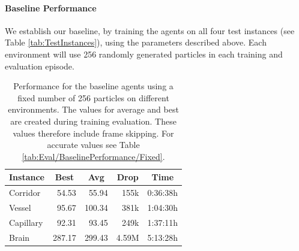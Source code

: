 \paragraph{Baseline Performance}
We establish our baseline, by training the agents on all four test instances (see Table \ref{tab:TestInstances}), using the parameters described above. Each environment will use 256 randomly generated particles in each training and evaluation episode. 

\begin{table}[htp]
    \begin{center}
        \begin{tabular}{lrrrr}
            \toprule
            \multicolumn{1}{c}{Instance} & \multicolumn{1}{c}{Best} & \multicolumn{1}{c}{Avg} & \multicolumn{1}{c}{Drop} & \multicolumn{1}{c}{Time}\\
            \midrule
            Corridor & 54.53 & 55.94 & 155k  & 0:36:38h \\
            Vessel & 95.67 & 100.34 & 381k & 1:04:30h \\
            Capillary & 92.31 & 93.45 & 249k & 1:37:11h \\
            Brain & 287.17 & 299.43 & 4.59M & 5:13:28h \\
            \bottomrule
        \end{tabular}
    \end{center}
    \caption[Baseline Training Performance for Agents on Different Environments]{Performance for the baseline agents using a fixed number of 256 particles on different environments. The values for average and best are created during training evaluation. These values therefore include frame skipping. For accurate values see Table \ref{tab:Eval/BaselinePerformance/Fixed}.} \label{tab:Eval/BaselinePerformance/Training}
\end{table}

